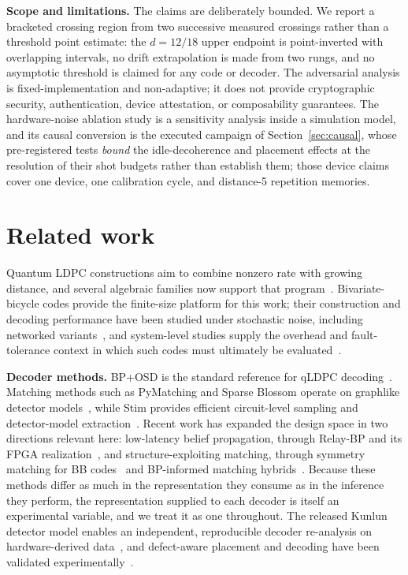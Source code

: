 \documentclass[pdflatex,sn-mathphys-num]{sn-jnl}
\theoremstyle{thmstyleone}
\theoremstyle{thmstyletwo}
\theoremstyle{thmstylethree}
\begin{document}
\noindent\textbf{Scope and limitations.}
The claims are deliberately bounded. We report a bracketed crossing region from two successive measured crossings rather than a threshold point estimate: the $d{=}12/18$ upper endpoint is point-inverted with overlapping intervals, no drift extrapolation is made from two rungs, and no asymptotic threshold is claimed for any code or decoder. The adversarial analysis is fixed-implementation and non-adaptive; it does not provide cryptographic security, authentication, device attestation, or composability guarantees. The hardware-noise ablation study is a sensitivity analysis inside a simulation model, and its causal conversion is the executed campaign of Section~\ref{sec:causal}, whose pre-registered tests \emph{bound} the idle-decoherence and placement effects at the resolution of their shot budgets rather than establish them; those device claims cover one device, one calibration cycle, and distance-5 repetition memories.

\section{Related work}

Quantum LDPC constructions aim to combine nonzero rate with growing distance, and several algebraic families now support that program~\cite{TillichZemor2014,PanteleevKalachev2022,LeverrierZemor2022}. Bivariate-bicycle codes provide the finite-size platform for this work; their construction and decoding performance have been studied under stochastic noise, including networked variants~\cite{Bravyi2024,ShawRengaswamy2026}, and system-level studies supply the overhead and fault-tolerance context in which such codes must ultimately be evaluated~\cite{Gottesman2014,FawziGrospellierLeverrier2018,ChristandlFawziGoswami2025}.

\noindent\textbf{Decoder methods.} BP+OSD is the standard reference for qLDPC decoding~\cite{Roffe2020,ldpcPackage}. Matching methods such as PyMatching and Sparse Blossom operate on graphlike detector models~\cite{Higgott2023,SparseBlossom2025}, while Stim provides efficient circuit-level sampling and detector-model extraction~\cite{Gidney2021}. Recent work has expanded the design space in two directions relevant here: low-latency belief propagation, through Relay-BP and its FPGA realization~\cite{Muller2025relay,Johnson2026relayfpga}, and structure-exploiting matching, through symmetry matching for BB codes~\cite{SahayBrown2026} and BP-informed matching hybrids~\cite{Higgott2023belief}. Because these methods differ as much in the representation they consume as in the inference they perform, the representation supplied to each decoder is itself an experimental variable, and we treat it as one throughout. The released Kunlun detector model enables an independent, reproducible decoder re-analysis on hardware-derived data~\cite{Wang2026kunlun}, and defect-aware placement and decoding have been validated experimentally~\cite{Bartlett2026defect}.
\end{document}
